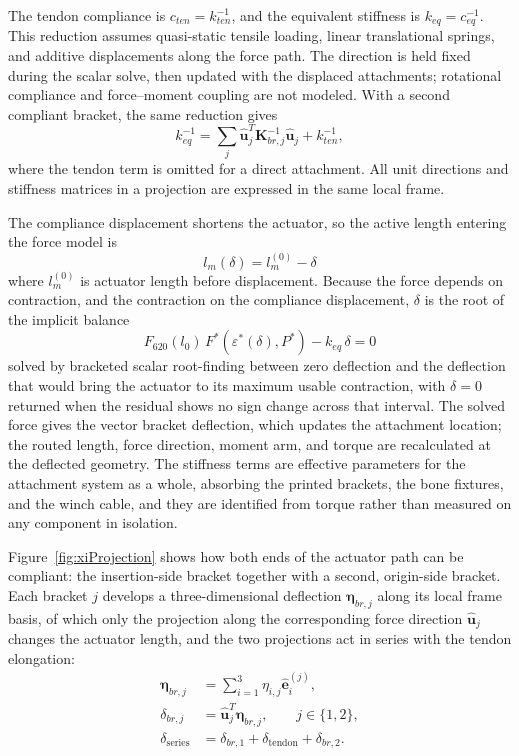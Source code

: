 \documentclass[utf8]{FrontiersinHarvard} %
\begin{document}
The tendon compliance is $c_{ten}=k_{ten}^{-1}$, and the equivalent stiffness is $k_{eq}=c_{eq}^{-1}$. This reduction assumes quasi-static tensile loading, linear translational springs, and additive displacements along the force path. The direction is held fixed during the scalar solve, then updated with the displaced attachments; rotational compliance and force--moment coupling are not modeled. With a second compliant bracket, the same reduction gives
\begin{equation}
k_{eq}^{-1}=\sum_j\hat{\mathbf{u}}_j^T\mathbf{K}_{br,j}^{-1}\hat{\mathbf{u}}_j+k_{ten}^{-1},
\label{eq:two_bracket_stiffness}
\end{equation}
where the tendon term is omitted for a direct attachment. All unit directions and stiffness matrices in a projection are expressed in the same local frame.

The compliance displacement shortens the actuator, so the active length entering the force model is
\begin{equation} l_m(\delta) = l_m^{(0)} - \delta
\label{eq:activelengthcorrected}
\end{equation}
where $l_m^{(0)}$ is actuator length before displacement. Because the force depends on contraction, and the contraction on the compliance displacement, $\delta$ is the root of the implicit balance
\begin{equation} F_{620}(l_{0}) \, F^{*}\!\left(\varepsilon^*(\delta),P^*\right) - k_{eq}\,\delta = 0
\label{eq:complianceforcebalance}
\end{equation}
solved by bracketed scalar root-finding between zero deflection and the deflection that would bring the actuator to its maximum usable contraction, with $\delta = 0$ returned when the residual shows no sign change across that interval. The solved force gives the vector bracket deflection, which updates the attachment location; the routed length, force direction, moment arm, and torque are recalculated at the deflected geometry. The stiffness terms are effective parameters for the attachment system as a whole, absorbing the printed brackets, the bone fixtures, and the winch cable, and they are identified from torque rather than measured on any component in isolation.

Figure~\ref{fig:xiProjection} shows how both ends of the actuator path can be compliant: the insertion-side bracket together with a second, origin-side bracket. Each bracket $j$ develops a three-dimensional deflection $\boldsymbol{\eta}_{br,j}$ along its local frame basis, of which only the projection along the corresponding force direction $\hat{\mathbf{u}}_j$ changes the actuator length, and the two projections act in series with the tendon elongation:
\begin{equation}
\begin{aligned}
\boldsymbol{\eta}_{br,j} &= \sum_{i=1}^{3}\eta_{i,j}\hat{\mathbf{e}}_i^{(j)},\\
\delta_{br,j} &= \hat{\mathbf{u}}_j^T\boldsymbol{\eta}_{br,j}, \qquad j\in\{1,2\},\\
\delta_{\mathrm{series}} &= \delta_{br,1}+\delta_{\mathrm{tendon}}+\delta_{br,2}.
\end{aligned}
\label{eq:bracket_series_projection}
\end{equation}
\end{document}
